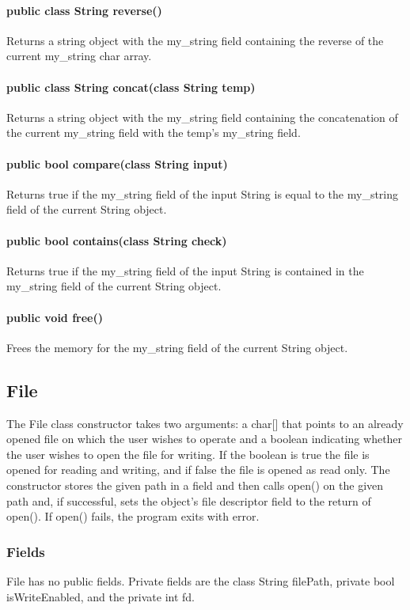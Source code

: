 \begin{homeworkProblem}
	\paragraph{public class String reverse()}
	Returns a string object with the my\_string field containing the reverse of the current my\_string char array.
	\paragraph{public class String concat(class String temp)}
	Returns a string object with the my\_string field containing the concatenation of the current my\_string field with the temp's my\_string field.
	\paragraph{public bool compare(class String input)}
	Returns true if the my\_string field of the input String is equal to the my\_string field of the current String object.
	\paragraph{public bool contains(class String check)}
	Returns true if the my\_string field of the input String is contained in the my\_string field of the current String object.
	\paragraph{public void free()}
	Frees the memory for the my\_string field of the current String object.
	
	\subsection{File}
	The File class constructor takes two arguments: a char[] that points to an already opened file on which the user wishes to operate and a boolean indicating whether the user wishes to open the file for writing. If the boolean is true the file is opened for reading and writing, and if false the file is opened as read only. The constructor stores the given path in a field and then calls open() on the given path and, if successful, sets the object's file descriptor field to the return of open(). If open() fails, the program exits with error.
	\subsubsection{Fields}
	File has no public fields. Private fields are the class String filePath, private bool isWriteEnabled, and the private int fd.
	

\end{homeworkProblem}
